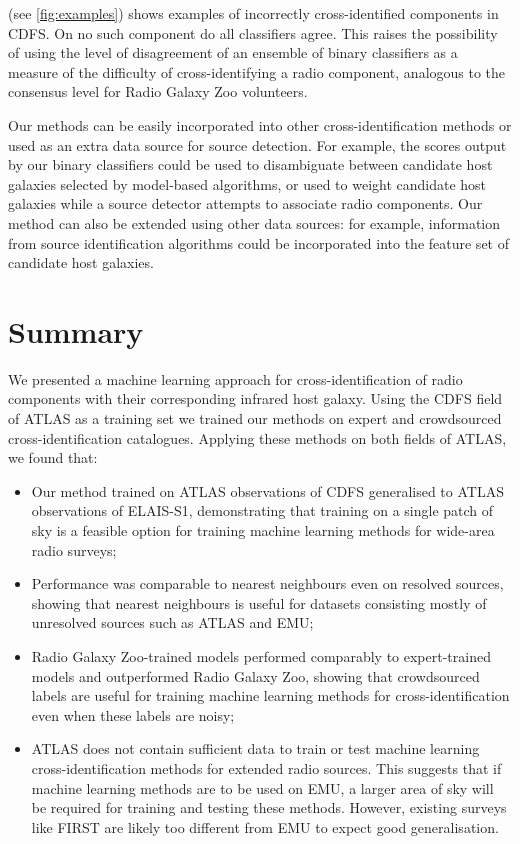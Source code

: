   { (see \autoref{fig:examples}) shows examples of incorrectly cross-identified
  components in CDFS. On no such component do all classifiers agree.
  This raises the possibility of using the level of disagreement of an
  ensemble of binary classifiers as a measure of the difficulty of cross-identifying a radio component,
  analogous to the consensus level for Radio Galaxy Zoo volunteers.}

  Our methods can be easily incorporated into other cross-identification
  methods or used as an extra data source for source detection. For
  example, the scores output by our binary classifiers could be used to
  disambiguate between candidate host
  galaxies selected by model-based algorithms, or used to weight candidate
  host galaxies while a source detector attempts to associate radio
  components. Our method can also be extended using other data sources: for
  example, information from source identification algorithms could be
  incorporated into the feature set of candidate host galaxies.

\section{Summary}

  We presented a machine learning approach for cross-identification of radio
  components with their corresponding infrared host galaxy. Using the CDFS
  field of ATLAS as a training set we trained our
  methods on expert and crowdsourced cross-identification catalogues.
  Applying these methods on both fields of ATLAS, we found that:
  \begin{itemize}
    \item Our method trained on ATLAS observations of CDFS generalised to
    ATLAS observations of ELAIS-S1, demonstrating that training on a single
    patch of sky is a feasible option for training machine learning methods
    for wide-area radio surveys;
    \item Performance was comparable to nearest neighbours even on resolved
    sources, showing that nearest neighbours is useful for datasets consisting
    mostly of unresolved sources such as ATLAS and EMU;
    \item Radio Galaxy Zoo-trained models performed comparably to
    expert-trained models and outperformed Radio Galaxy Zoo, showing that
    crowdsourced labels are useful for training machine learning methods for
    cross-identification even when these labels are noisy;
    \item ATLAS does not contain sufficient data to train or test machine
    learning cross-identification methods for extended radio sources. This
    suggests that if machine learning methods are to be used on EMU, a larger
    area of sky will be required for training and testing these methods.
    However, existing surveys like FIRST are likely too different from EMU to expect
    good generalisation.
  \end{itemize}

